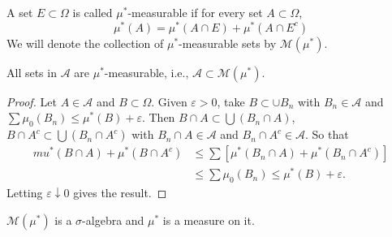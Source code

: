 \begin{definition}[$\mu^*$-measurable]
A set $E\subset \Omega$ is called $\mu^*$-measurable if for every set $A\subset \Omega$,
\begin{equation}
\mu^*(A)=\mu^*(A\cap E)+\mu^*(A\cap E^c)
\end{equation}
We will denote the collection of $\mu^*$-measurable sets by $\mathcal M(\mu^*)$.
\end{definition}


\begin{lemma}
All sets in $\mathcal A$ are $\mu^*$-measurable, i.e., $\mathcal A\subset \mathcal M(\mu^*)$.
\end{lemma}

\begin{proof}
Let $A\in \mathcal A$ and $B\subset \Omega$. Given $\varepsilon>0$, take $B\subset \cup B_n$ with $B_n\in\mathcal A$ and $\sum \mu_0(B_n)\leq \mu^*(B)+\varepsilon$. Then $B\cap A\subset \bigcup(B_n\cap A)$, $B\cap A^c\subset \bigcup(B_n\cap A^c)$ with $B_n\cap A\in \mathcal A$ and $B_n\cap A^c\in \mathcal A$. So that
\begin{align*}
mu^*(B\cap A)+\mu^*(B\cap A^c)&\leq \sum[\mu^*(B_n\cap A)+\mu^*(B_n\cap A^c)]\\
&\leq \sum \mu_0(B_n)\leq \mu^*(B)+\varepsilon.
\end{align*}
Letting $\varepsilon \downarrow 0$ gives the result.
\end{proof}


\begin{lemma}
$\mathcal M(\mu^*)$ is a $\sigma$-algebra and $\mu^*$ is a measure on it.
\end{lemma}

